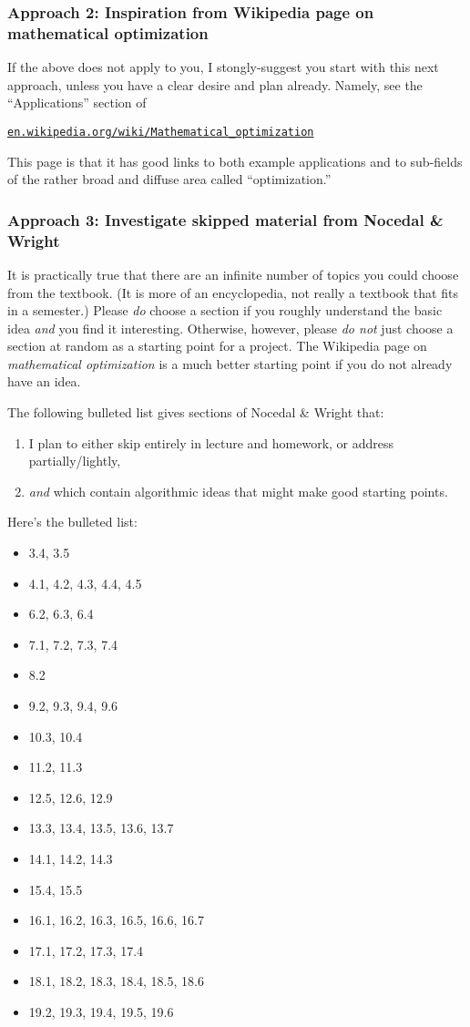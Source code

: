 \documentclass[12pt]{amsart}
\begin{document}
\subsubsection*{Approach 2: Inspiration from Wikipedia page on mathematical optimization}  If the above does not apply to you, I stongly-suggest you start with this next approach, unless you have a clear desire and plan already.  Namely, see the ``Applications'' section of

   \centerline{\href{https://en.wikipedia.org/wiki/Mathematical_optimization}{\texttt{en.wikipedia.org/wiki/Mathematical\_optimization}}}

\noindent This page is that it has good links to both example applications and to sub-fields of the rather broad and diffuse area called ``optimization.''

\subsubsection*{Approach 3: Investigate skipped material from Nocedal \& Wright}  It is practically true that there are an infinite number of topics you could choose from the textbook.  (It is more of an encyclopedia, not really a textbook that fits in a semester.)  Please \emph{do} choose a section if you roughly understand the basic idea \emph{and} you find it interesting.  Otherwise, however, please \emph{do not} just choose a section at random as a starting point for a project.  The Wikipedia page on \emph{mathematical optimization} is a much better starting point if you do not already have an idea.

The following bulleted list gives sections of Nocedal \& Wright that:
\renewcommand{\labelenumi}{\roman{enumi})}
\begin{enumerate}
\item I plan to either skip entirely in lecture and homework, or address partially/lightly,
\item \emph{and} which contain algorithmic ideas that might make good starting points.
\end{enumerate}
Here's the bulleted list:
\begin{itemize}
\item 3.4, 3.5
\item 4.1, 4.2, 4.3, 4.4, 4.5
\item 6.2, 6.3, 6.4
\item 7.1, 7.2, 7.3, 7.4
\item 8.2
\item 9.2, 9.3, 9.4, 9.6
\item 10.3, 10.4
\item 11.2, 11.3
\item 12.5, 12.6, 12.9
\item 13.3, 13.4, 13.5, 13.6, 13.7
\item 14.1, 14.2, 14.3
\item 15.4, 15.5
\item 16.1, 16.2, 16.3, 16.5, 16.6, 16.7
\item 17.1, 17.2, 17.3, 17.4
\item 18.1, 18.2, 18.3, 18.4, 18.5, 18.6
\item 19.2, 19.3, 19.4, 19.5, 19.6
\end{itemize}
\end{document}
